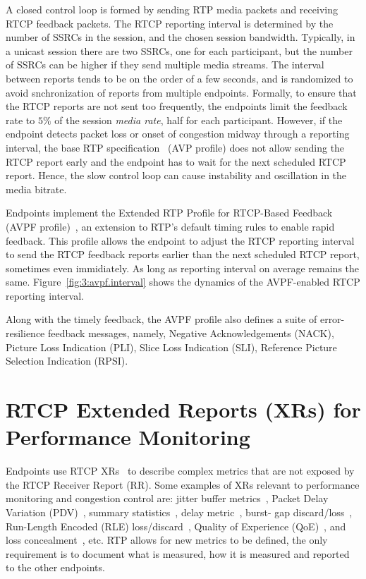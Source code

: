 A closed control loop is formed by sending RTP media packets and receiving
RTCP feedback packets. The RTCP reporting interval is determined by the number
of SSRCs in the session, and the chosen session bandwidth. Typically, in a
unicast session there are two SSRCs, one for each participant, but the number
of SSRCs can be higher if they send multiple media streams. The interval
between reports tends to be on the order of a few seconds, and is randomized
to avoid snchronization of reports from multiple endpoints. Formally, to
ensure that the RTCP reports are not sent too frequently, the endpoints limit
the feedback rate to $5\%$ of the session \textit{media rate}, half for each
participant. However, if the endpoint detects packet loss or onset of
congestion midway through a reporting interval, the base RTP
specification~\cite{rfc3550} (AVP profile) does not allow sending the RTCP
report early and the endpoint has to wait for the next scheduled RTCP report.
Hence, the slow control loop can cause instability and oscillation in the
media bitrate.


Endpoints implement the Extended RTP Profile for RTCP-Based Feedback (AVPF
profile)~\cite{rfc4585}, an extension to RTP's default timing rules to enable
rapid feedback. This profile allows the endpoint to adjust the RTCP reporting
interval to send the RTCP feedback reports earlier than the next scheduled
RTCP report, sometimes even immidiately. As long as reporting interval on
average remains the same. Figure~\ref{fig:3:avpf.interval} shows the dynamics
of the AVPF-enabled RTCP reporting interval.

Along with the timely feedback, the AVPF profile also defines a suite of
error-resilience feedback messages, namely, Negative Acknowledgements (NACK),
Picture Loss Indication (PLI), Slice Loss Indication (SLI), Reference Picture
Selection Indication (RPSI).

\section{RTCP Extended Reports (XRs) for Performance Monitoring}

Endpoints use RTCP XRs~\cite{rfc3611} to describe complex metrics that are not
exposed by the RTCP Receiver Report (RR). Some examples of XRs relevant to
performance monitoring and congestion control are: jitter buffer
metrics~\cite{draft.xr.jb}, Packet Delay Variation (PDV)~\cite{rfc6798},
summary statistics~\cite{draft.xr.stat}, delay metric~\cite{rfc6843}, burst-
gap discard/loss~\cite{draft.xr.bg.loss, draft.xr.bg.discard}, Run-Length
Encoded (RLE) loss/discard~\cite{draft.xr.discard.rle}, Quality of Experience
(QoE)~\cite{draft.xr.qoe}, and loss concealment~\cite{draft.xr.conceal}, etc.
RTP allows for new metrics to be defined, the only requirement is to document
what is measured, how it is measured and reported to the other endpoints.


